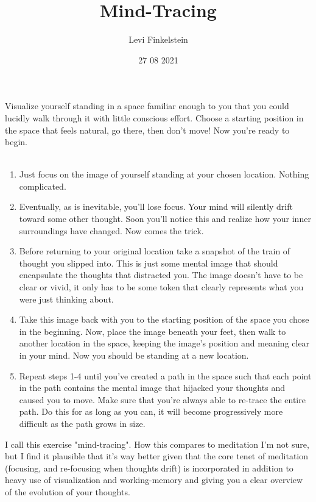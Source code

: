 \usepackage{pgfplots}
\title{Mind-Tracing}
\author{Levi Finkelstein}
\date{27 08 2021}

\maketitle

Visualize yourself standing in a space familiar enough to you that you could lucidly walk through it with little conscious effort. Choose a starting position in the space that feels natural, go there, then don't move! Now you're ready to begin.
\\\\
\begin{enumerate}
    \item Just focus on the image of yourself standing at your chosen location. Nothing complicated.
    \item  Eventually, as is inevitable, you'll lose focus. Your mind will silently drift toward some other thought. Soon you'll notice this and realize how your inner surroundings have changed. Now comes the trick.
    \item  Before returning to your original location take a snapshot of the train of thought you slipped into. This is just some mental image that should encapsulate the thoughts that distracted you. The image doesn't have to be clear or vivid, it only has to be some token that clearly represents what you were just thinking about.
    \item  Take this image back with you to the starting position of the space you chose in the beginning. Now, place the image beneath your feet, then walk to another location in the space, keeping the image's position and meaning clear in your mind. Now you should be standing at a new location.
    \item Repeat steps 1-4 until you've created a path in the space such that each point in the path contains the mental image that hijacked your thoughts and caused you to move. Make sure that you're always able to re-trace the entire path. Do this for as long as you can, it will become progressively more difficult as the path grows in size.
 
\end{enumerate}
 I call this exercise "mind-tracing". How this compares to meditation I'm not sure, but I find it plausible that it's way better given that the core tenet of meditation (focusing, and re-focusing when thoughts drift) is incorporated in addition to heavy use of visualization and working-memory and giving you a clear overview of the evolution of your thoughts.


